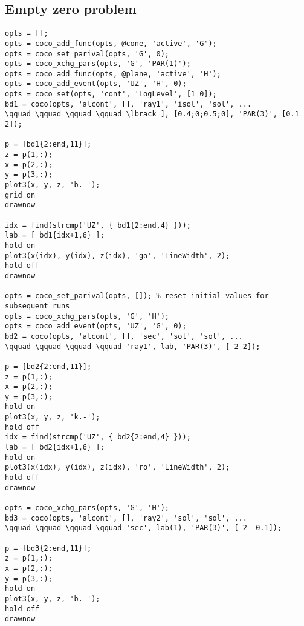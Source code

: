 \documentclass{article}
\begin{document}
\subsection{Empty zero problem}
\begin{verbatim}
opts = [];
opts = coco_add_func(opts, @cone, 'active', 'G');
opts = coco_set_parival(opts, 'G', 0);
opts = coco_xchg_pars(opts, 'G', 'PAR(1)');
opts = coco_add_func(opts, @plane, 'active', 'H');
opts = coco_add_event(opts, 'UZ', 'H', 0);
opts = coco_set(opts, 'cont', 'LogLevel', [1 0]);
bd1 = coco(opts, 'alcont', [], 'ray1', 'isol', 'sol', ...
\qquad \qquad \qquad \qquad \lbrack ], [0.4;0;0.5;0], 'PAR(3)', [0.1 2]);
 
p = [bd1{2:end,11}];
z = p(1,:);
x = p(2,:);
y = p(3,:);
plot3(x, y, z, 'b.-');
grid on
drawnow
 
idx = find(strcmp('UZ', { bd1{2:end,4} }));
lab = [ bd1{idx+1,6} ];
hold on
plot3(x(idx), y(idx), z(idx), 'go', 'LineWidth', 2);
hold off
drawnow
 
opts = coco_set_parival(opts, []); % reset initial values for subsequent runs
opts = coco_xchg_pars(opts, 'G', 'H');
opts = coco_add_event(opts, 'UZ', 'G', 0);
bd2 = coco(opts, 'alcont', [], 'sec', 'sol', 'sol', ...
\qquad \qquad \qquad \qquad 'ray1', lab, 'PAR(3)', [-2 2]);
 
p = [bd2{2:end,11}];
z = p(1,:);
x = p(2,:);
y = p(3,:);
hold on
plot3(x, y, z, 'k.-');
hold off
idx = find(strcmp('UZ', { bd2{2:end,4} }));
lab = [ bd2{idx+1,6} ];
hold on
plot3(x(idx), y(idx), z(idx), 'ro', 'LineWidth', 2);
hold off
drawnow
 
opts = coco_xchg_pars(opts, 'G', 'H');
bd3 = coco(opts, 'alcont', [], 'ray2', 'sol', 'sol', ...
\qquad \qquad \qquad \qquad 'sec', lab(1), 'PAR(3)', [-2 -0.1]);
 
p = [bd3{2:end,11}];
z = p(1,:);
x = p(2,:);
y = p(3,:);
hold on
plot3(x, y, z, 'b.-');
hold off
drawnow
\end{verbatim}

\newpage 
\end{document}
